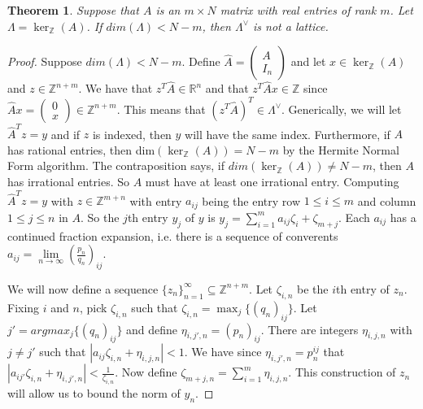 \documentclass{article}
\newcommand{\nl}{\bigskip \\ } %
\renewcommand{\leq}{\leqslant}
\newcommand{\Z}[0]{\mathbb{Z}}		%
\newcommand{\R}[0]{\mathbb{R}}		%
\newtheorem{thm}{Theorem}[section]
\theoremstyle{definition}
\theoremstyle{remark}
\begin{document}
\newpage
\begin{thm} \label{dualNotLattice}
Suppose that $A$ is an $m\times N$ matrix with real %
entries of rank $m$.  Let $\Lambda = \ker_\Z(A)$. If $dim(\Lambda) < N-m$, then $\Lambda^\vee $ is not a lattice. 
\end{thm}
\begin{proof}
Suppose $dim(\Lambda)<N-m$. Define $\hat A = \begin{pmatrix}
A \\ I_n\end{pmatrix}$ and let $x\in \ker_\Z(A)$ and $z\in \Z^{n+m}$. We have that $z^T\hat A \in \R^n$ and that $z^T\hat A x \in \Z$  since $ \hat A x = \begin{pmatrix} 0 \\ x \end{pmatrix}\in \Z^{n+m}$. This means that  $(z^T\hat A)^T\in \Lambda^\vee$. Generically, we will let $\hat A^T z = y$ and if $z$ is indexed, then $y$ will have the same index.  Furthermore, if $A$ has rational entries, then dim$(\ker_\Z(A))= N-m$ by the Hermite Normal Form algorithm. The contraposition says, if $dim(\ker_\Z(A))  \neq N-m$, then $A$ has irrational entries. So $A$ must have at least one irrational entry. %
Computing $\hat A^Tz=y$ with $z\in \Z^{m+n}$ with entry $a_{ij}$ being the entry row $1\leq i\leq m$ and column $1\leq j\leq n$ in $A$. So the $j$th entry $y_j$ of $y$ is $y_j = \sum\limits_{i=1}^m a_{ij} \zeta_i + \zeta_{m+j}$. Each $a_{ij}$ has a continued fraction expansion, i.e. there is a sequence of converents $a_{ij} = \lim\limits_{n\to \infty} \left(\frac{p_{n}}{q_{n}}\right)_{ij}$. 

We will now define a sequence $\{z_n\}_{n=1}^\infty\subseteq \Z^{n+m}$. Let $\zeta_{i,n}$ be the $i$th entry of $z_n$. Fixing $i$ and $n$, pick $\zeta_{i,n}$ such that $\zeta_{i,n} = \max_j\{(q_n)_{ij}\}$. Let $j'=argmax_j\{(q_n)_{ij}\}$ and define $\eta_{i,j',n} =(p_n)_{ij}$.  There are integers $\eta_{i,j,n}$ with $j\neq j'$ such that $|a_{ij}\zeta_{i,n} + \eta_{i,j,n}|< 1$. We have since $\eta_{i,j',n} =p_n^{ij}$ that $|a_{ij'}\zeta_{i,n} +\eta_{i,j',n}|< \frac{1}{\zeta_{i,n}} $.  Now define $\zeta_{m+j,n} = \sum\limits_{i=1}^m \eta_{i,j,n}.$ This construction of $z_n$ will allow us to bound the norm of $y_n$.


\end{proof}
\end{document}
